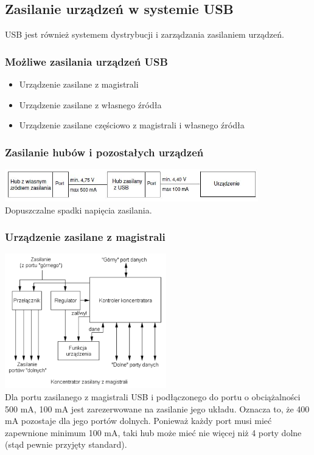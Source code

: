 \subsection{Zasilanie urządzeń w systemie USB}
	USB jest również systemem dystrybucji i zarządzania zasilaniem urządzeń.
	\subsubsection{Możliwe zasilania urządzeń USB}
	\begin{itemize}
		\item Urządzenie zasilane z magistrali
		\item Urządzenie zasilane z własnego źródła
		\item Urządzenie zasilane częściowo z magistrali i własnego źródła
	\end{itemize}
	\subsubsection{Zasilanie hubów i pozostałych urządzeń}
		\includegraphics[width=11cm]{./wyklady/USB_38_1.jpg}\\
		Dopuszczalne spadki napięcia zasilania.
	\subsubsection{Urządzenie zasilane z magistrali}
		\includegraphics[width=7cm]{./wyklady/USB_39_1.pdf}\\
		Dla portu zasilanego z magistrali USB i podłączonego do portu o obciążalności 500 mA, 100 mA jest zarezerwowane na zasilanie jego układu. Oznacza to, że 400 mA pozostaje dla jego portów dolnych. Ponieważ każdy port musi mieć zapewnione minimum 100 mA, taki hub może mieć nie więcej niż 4 porty dolne (stąd pewnie przyjęty standard).
